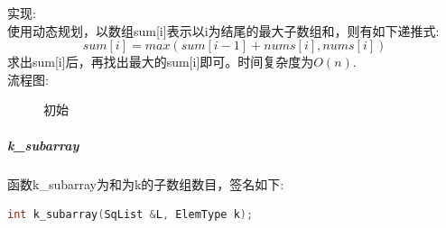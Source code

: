 \documentclass[supercite]{Experimental_Report}
\theoremstyle{definition}
\begin{document}
\noindent
实现: \\
使用动态规划，以数组sum[i]表示以i为结尾的最大子数组和，则有如下递推式: $$sum[i] = max(sum[i - 1] + nums[i], nums[i])$$
求出sum[i]后，再找出最大的sum[i]即可。时间复杂度为$O(n)$.\\
\clearpage
流程图:
\begin{figure}[htbp]
	\centering
	\centering
	\caption{初始}
	\label{fig6-3}
\end{figure}

\subparagraph{k\_subarray}
\noindent
函数k\_subarray为和为k的子数组数目，签名如下:
\begin{lstlisting}[language=C++, frame=single]
int k_subarray(SqList &L, ElemType k);
\end{lstlisting}
\end{document}
